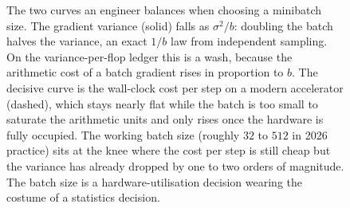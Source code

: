 \begin{figure}[ht]
\centering
{}
\caption[Minibatch variance and cost against batch size]{The two
curves an engineer balances when choosing a minibatch size. The
gradient variance (solid) falls as $\sigma^{2}/b$: doubling the batch
halves the variance, an exact $1/b$ law from independent sampling. On
the variance-per-flop ledger this is a wash, because the arithmetic
cost of a batch gradient rises in proportion to $b$. The decisive
curve is the wall-clock cost per step on a modern accelerator
(dashed), which stays nearly flat while the batch is too small to
saturate the arithmetic units and only rises once the hardware is
fully occupied. The working batch size (roughly $32$ to $512$ in 2026
practice) sits at the knee where the cost per step is still cheap but
the variance has already dropped by one to two orders of magnitude.
The batch size is a hardware-utilisation decision wearing the costume
of a statistics decision.}
\label{fig:vol02:ch15:sgd-variance}
\end{figure}
